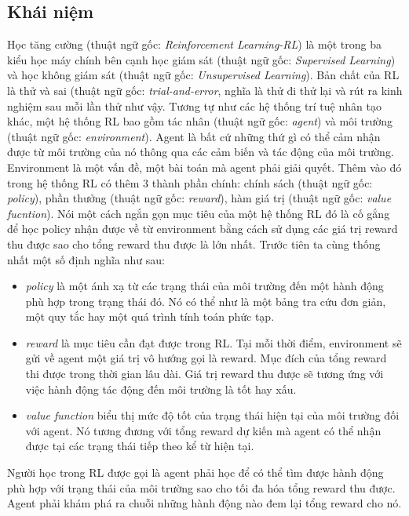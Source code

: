 \label{sec:formalize}
\subsection{Khái niệm}
Học tăng cường (thuật ngữ gốc: \emph{Reinforcement Learning-RL})\cite{sutton1998introduction} là một trong ba kiểu học máy chính bên cạnh học giám sát (thuật ngữ gốc: \emph{Supervised Learning}) và học không giám sát (thuật ngữ gốc: \emph{Unsupervised Learning}). Bản chất của RL là thử và sai (thuật ngữ gốc: \emph{trial-and-error}, nghĩa là thử đi thử lại và rút ra kinh nghiệm sau mỗi lần thử như vậy. Tương tự như các hệ thống trí tuệ nhân tạo khác, một hệ thống RL bao gồm tác nhân (thuật ngữ gốc: \emph{agent}) và môi trường (thuật ngữ gốc: \emph{environment}). Agent là bất cứ những thứ gì có thể cảm nhận\cite{russell2009artificial} được từ môi trường của nó thông qua các cảm biến và tác động của môi trường. 
Environment là một vấn đề, một bài toán mà agent phải giải quyết. Thêm vào đó trong hệ thống RL có thêm 3 thành phần chính: chính sách (thuật ngữ gốc: \emph{policy}), phần thưởng (thuật ngữ gốc: \emph{reward}), hàm giá trị (thuật ngữ gốc: \emph{value fucntion}). Nói một cách ngắn gọn mục tiêu của một hệ thống RL đó là cố gắng để học policy nhận được về từ environment bằng cách sử dụng các giá trị reward thu được sao cho tổng reward thu được là lớn nhất. Trước tiên ta cùng thống nhất một số định nghĩa như sau:
\begin{itemize}
    \item \emph{policy} là một ánh xạ từ các trạng thái
của môi trường đến một hành động phù hợp trong trạng thái đó. Nó có thể như là một bảng tra cứu đơn giản, một quy tắc hay một quá trình tính toán phức tạp. 
    \item \emph{reward} là mục tiêu cần đạt được trong RL. Tại mỗi thời điểm, environment sẽ gửi về agent một giá trị vô hướng gọi là reward. Mục đích của tổng reward thi được trong thời gian lâu dài. Giá trị reward thu được sẽ tương ứng với việc hành động tác động đến môi trường là tốt hay xấu.
    \item \emph{value function} biểu thị mức độ tốt của trạng thái hiện tại của môi trường đối với agent. Nó tương đương với tổng reward dự kiến mà agent có thể nhận được tại các trạng thái tiếp theo kể từ hiện tại.
\end{itemize}
Người học trong RL được gọi là agent phải học để có thể tìm được hành động phù hợp với trạng thái của môi trường sao cho tối đa hóa tổng reward thu được. Agent phải khám phá ra chuỗi những hành động nào đem lại tổng reward cho nó.

